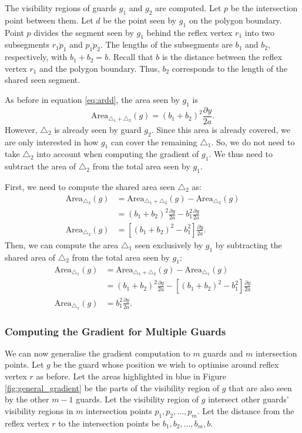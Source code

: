 The visibility regions of guards $g_1$ and $g_2$ are computed. Let $p$ be the intersection point between them. Let $d$ be the point seen by $g_1$ on the polygon boundary. Point $p$ divides the segment seen by $g_1$ behind the reflex vertex $r_1$ into two subsegments $\overline{r_1p_1}$ and $\overline{p_1p_2}$. The lengths of the subsegments are $b_1$ and $b_2$, respectively, with $b_1 + b_2 = b$. Recall that $b$ is the distance between the reflex vertex $r_1$ and the polygon boundary. Thus,  $b_2$ corresponds to the length of the shared seen segment.

As before in equation \ref{eq:ardd}, the area seen by $g_1$ is $$\text{Area}_{\triangle_1 + \triangle_2}(g) = (b_1 + b_2)^2\frac{\partial y}{2a}.$$
However, $\triangle_2$ is already seen by guard $g_2$. Since this area is already covered, we are only interested in how $g_1$ can cover the remaining $\triangle_1$. So, we do not need to take $\triangle_2$ into account when computing the gradient of $g_1$. We thus need to subtract the area of $\triangle_2$ from the total area seen by $g_1$. 

First, we need to compute the shared area seen $\triangle_2$ as:
\begin{align}
    \text{Area}_{\triangle_2}(g) &= \text{Area}_{\triangle_1 + \triangle_2}(g) - \text{Area}_{\triangle_2}(g) \nonumber \\
                              &= (b_1 + b_2)^2\frac{\partial y}{2a} - b_1^2\frac{\partial y}{2a} \nonumber \\
    \text{Area}_{\triangle_2}(g)&= \left[(b_1 + b_2)^2 - b_1^2\right]\frac{\partial y}{2a}. \label{eq:multiple_areas} 
\end{align}
Then, we can compute the area $\triangle_1$ seen exclusively by $g_1$ by subtracting the shared area of $\triangle_2$ from the total area seen by $g_1$: 
\begin{align*}
    \text{Area}_{\triangle_1}(g) &= \text{Area}_{\triangle_1 + \triangle_2}(g) - \text{Area}_{\triangle_1}(g) \\
                              &= (b_1 + b_2)^2\frac{\partial y}{2a} - \left[(b_1 + b_2)^2 - b_1^2\right]\frac{\partial y}{2a} \\
    \text{Area}_{\triangle_1}(g) &= b_1^2\frac{\partial y}{2a}. 
\end{align*}

\subsubsection{Computing the Gradient for Multiple Guards}
We can now generalise the gradient computation to $m$ guards and $m$ intersection points. Let $g$ be the guard whose position we wish to optimise around reflex vertex $r$ as before. Let the areas highlighted in blue in Figure \ref{fig:general_gradient} be the parts of the visibility region of $g$ that are also seen by the other $m - 1$ guards. Let the visibility region of $g$ intersect other guards' visibility regions in $m$ intersection points $p_1, p_2, ..., p_m$. Let the distance from the reflex vertex $r$ to the intersection points be $b_{1}, b_{2}, ..., b_{m}, b$.

